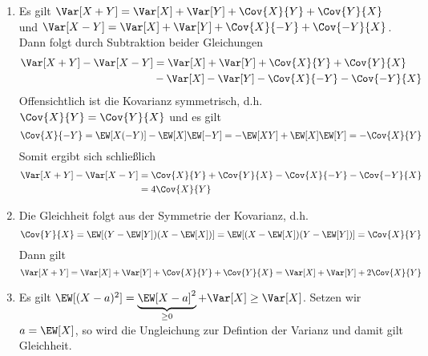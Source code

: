 \begin{exercisePage}
	\begin{enumerate}[leftmargin=*, label=(zu \alph*)]
		\item Es gilt $\Var[X+Y] = \Var[X] + \Var[Y] + \Cov{X}{Y} + \Cov{Y}{X}$ und $\Var[X-Y] = \Var[X] + \Var[Y] + \Cov{X}{-Y} + \Cov{-Y}{X}$. Dann folgt durch Subtraktion beider Gleichungen
		\begin{equation*}
			\begin{aligned}
			\Var[X+Y] - \Var[X-Y] &= \Var[X] + \Var[Y] + \Cov{X}{Y} + \Cov{Y}{X} \\
			&- \Var[X] - \Var[Y] - \Cov{X}{-Y} - \Cov{-Y}{X}
			\end{aligned}
		\end{equation*}
		Offensichtlich ist die Kovarianz symmetrisch, d.h. $\Cov{X}{Y} = \Cov{Y}{X}$ und es gilt
		\begin{equation*}
			\Cov{X}{-Y} = \EW[X(-Y)] - \EW[X] \EW[-Y] = -\EW[XY] + \EW[X] \EW[Y] = - \Cov{X}{Y} 
		\end{equation*}
		Somit ergibt sich schließlich
		\begin{equation*}
		\begin{aligned}
			\Var[X+Y] - \Var[X-Y] 
			&= \Cov{X}{Y} + \Cov{Y}{X} - \Cov{X}{-Y} - \Cov{-Y}{X} \\
			&= 4 \Cov{X}{Y}
		\end{aligned}
		\end{equation*}
		\item Die Gleichheit folgt aus der Symmetrie der Kovarianz, d.h.
		\begin{equation*}
			\Cov{Y}{X} = \EW[ (Y - {\EW[Y]}) (X - {\EW[X]}) ] 
			= \EW[ (X - {\EW[X]}) (Y - {\EW[Y]}) ] = \Cov{X}{Y}
		\end{equation*}
		Dann gilt
		\begin{equation*}
			\Var[X+Y] = \Var[X] + \Var[Y] + \Cov{X}{Y} + \Cov{Y}{X} = \Var[X] + \Var[Y] + 2\Cov{X}{Y}
		\end{equation*}
		\item Es gilt $\EW[(X-a)^2] = \underbrace{\EW[X-a]^2}_{\ge 0} + \Var[X] \ge \Var[X]$. Setzen wir $a = \EW[X]$, so wird die Ungleichung zur Defintion der Varianz und damit gilt Gleichheit.
	\end{enumerate}
	



\end{exercisePage}
